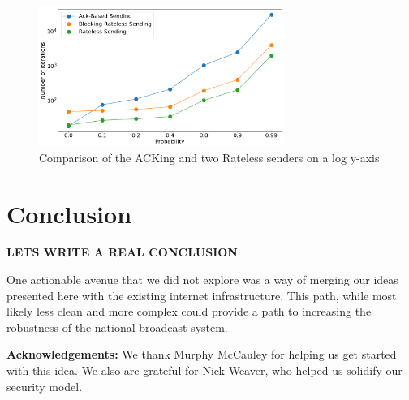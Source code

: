 \begin{figure}[tp]
\centering
\noindent
\includegraphics[width=8cm]{figures/big_font/triple_comp.png}
\caption{Comparison of the ACKing and two Rateless senders on a log y-axis}
\label{graph:ackvsratelessLOG}
\end{figure}

\section{Conclusion}
\textbf{LETS WRITE A REAL CONCLUSION}


One actionable avenue that we did not explore was a way of merging our ideas presented here with the existing internet infrastructure. This path, while most likely less clean and more complex could provide a path to  increasing the robustness of the national broadcast system.


\textbf{Acknowledgements:} We thank Murphy McCauley for helping us get started with this idea. We also are grateful for Nick Weaver, who helped us solidify our security model.



